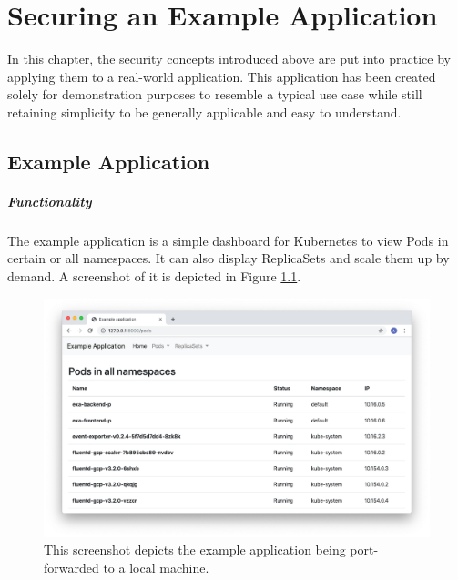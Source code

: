 \chapter{Securing an Example Application}

In this chapter, the security concepts introduced above are put into practice by applying them to a real-world application. This application has been created solely for demonstration purposes to resemble a typical use case while still retaining simplicity to be generally applicable and easy to understand.

\section{Example Application}

\paragraph{Functionality}

The example application is a simple dashboard for Kubernetes to view Pods in certain or all namespaces. It can also display ReplicaSets and scale them up by demand. A screenshot of it is depicted in Figure \ref{fig:exaScreenshot}.

\begin{figure}[H]
\begin{center}
    \includegraphics[width=1.0\linewidth]{figures/exa_screenshot.png}
    \caption[Screenshot of the example application]{This screenshot depicts the example application being port-forwarded to a local machine.}
    \label{fig:exaScreenshot}
\end{center}
\end{figure}

